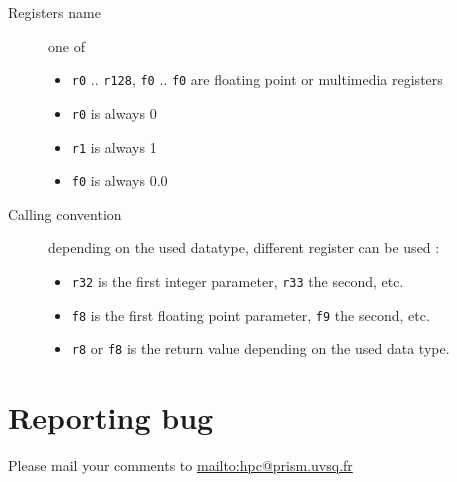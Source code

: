 \documentclass{article}
\begin{document}
\begin{description}
\item[Registers name] one of
  \begin{itemize}
  \item \verb|r0| .. \verb|r128|, \verb|f0| .. \verb|f0| are floating
    point or multimedia registers
  \item \verb|r0| is always 0
  \item \verb|r1| is always 1
  \item \verb|f0| is always 0.0
  \end{itemize}
\item[Calling convention] depending on the used datatype, different
  register can be used :
  \begin{itemize}
  \item \verb|r32| is the first integer parameter, \verb|r33| the
    second, etc.
  \item \verb|f8| is the first floating point parameter, \verb|f9| the
    second, etc.
  \item \verb|r8| or \verb|f8| is the return value depending on the
    used data type.
  \end{itemize}
\end{description}

\section{Reporting bug}

Please mail your comments to \url{mailto:hpc@prism.uvsq.fr}



\end{document}
